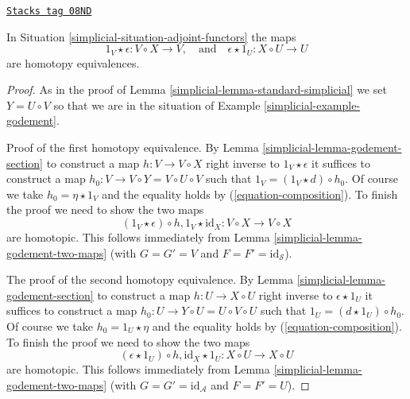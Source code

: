 \begin{lemma}
\label{simplicial-lemma-standard-simplicial-homotopy}
\href{https://stacks.math.columbia.edu/tag/08ND}{\texttt{Stacks tag 08ND}}

In Situation \ref{simplicial-situation-adjoint-functors} the maps
$$
1_V \star \epsilon : V \circ X \to V,
\quad\text{and}\quad
\epsilon \star 1_U : X \circ U \to U
$$
are homotopy equivalences.
\end{lemma}

\begin{proof}

As in the proof of Lemma \ref{simplicial-lemma-standard-simplicial}
we set $Y = U \circ V$ so that we are
in the situation of Example \ref{simplicial-example-godement}.

\medskip\noindent
Proof of the first homotopy equivalence. By Lemma \ref{simplicial-lemma-godement-section}
to construct a map
$h : V \to V \circ X$ right inverse to $1_V \star \epsilon$ it
suffices to construct a map $h_0 : V \to V \circ Y = V \circ U \circ V$
such that $1_V = (1_V \star d) \circ h_0$. Of course we take
$h_0 = \eta \star 1_V$ and the equality holds by (\ref{equation-composition}).
To finish the proof we need to show the two maps
$$
(1_V \star \epsilon) \circ h, 1_V \star \text{id}_X :
V \circ X \longrightarrow V \circ X
$$
are homotopic. This follows immediately from
Lemma \ref{simplicial-lemma-godement-two-maps} (with
$G = G' = V$ and $F = F' = \text{id}_\mathcal{S}$).

\medskip\noindent
The proof of the second homotopy equivalence. By
Lemma \ref{simplicial-lemma-godement-section} to construct a map
$h : U \to X \circ U$ right inverse to $\epsilon \star 1_U$ it
suffices to construct a map $h_0 : U \to Y \circ U = U \circ V \circ U$
such that $1_U = (d \star 1_U) \circ h_0$. Of course we take
$h_0 = 1_U \star \eta$ and the equality holds by (\ref{equation-composition}).
To finish the proof we need to show the two maps
$$
(\epsilon \star 1_U) \circ h, \text{id}_X \star 1_U :
X \circ U \longrightarrow X \circ U
$$
are homotopic. This follows immediately from
Lemma \ref{simplicial-lemma-godement-two-maps} (with
$G = G' = \text{id}_\mathcal{A}$ and $F = F' = U$).
\end{proof}


